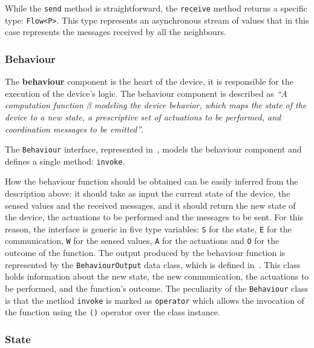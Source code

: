 While the \texttt{send} method is straightforward, the \texttt{receive} method returns a specific type: \texttt{Flow<P>}.
This type represents an asynchronous stream of values that in this case represents the messages received by all the neighbours.

\subsubsection{Behaviour}

The \textbf{behaviour} component is the heart of the device, it is responsible for the execution of the device's logic.
The behaviour component is described as \textit{``A computation function $\beta$
	modeling the device behavior, which maps the state of the device to a new state, a prescriptive set of actuations to be performed,
	and coordination messages to be emitted''}.

The \texttt{Behaviour} interface, represented in~, models the behaviour component and defines a single method:
\texttt{invoke}.



How the behaviour function should be obtained can be easily inferred from the description above: it should take as input the current state of
the device, the sensed values and the received messages, and it should return the new state of the device, the actuations to be performed and the
messages to be sent. For this reason, the interface is generic in five type variables: \texttt{S} for the state, \texttt{E} for the communication,
\texttt{W} for the sensed values, \texttt{A} for the actuations and \texttt{O} for the outcome of the function.
The output produced by the behaviour function is represented by the \texttt{BehaviourOutput} data class, which is defined
in~. This class holds information about the new state, the new communication, the actuations to be performed, and the
function's outcome.
The peculiarity of the \texttt{Behaviour} class is that the method \texttt{invoke} is marked as \texttt{operator} which allows the invocation of the
function using the \texttt{()} operator over the class instance.

\subsubsection{State}

